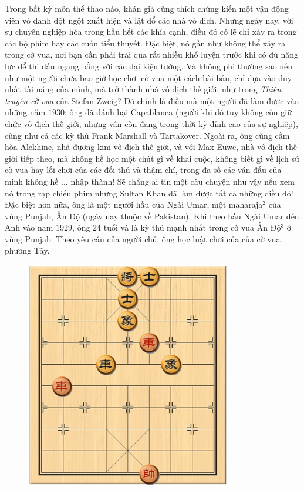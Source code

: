 \vspace*{170pt}
\begin{multicols}{2}
	Trong bất kỳ môn thể thao nào, khán giả cũng thích chứng kiến một vận động viên vô danh đột ngột xuất hiện và lật đổ các nhà vô địch. Nhưng ngày nay, với sự chuyên nghiệp hóa trong hầu hết các khía cạnh, điều đó có lẽ chỉ xảy ra trong các bộ phim hay các cuốn tiểu thuyết. Đặc biệt, nó gần như không thể xảy ra trong cờ vua, nơi bạn cần phải trải qua rất nhiều khổ luyện trước khi có đủ năng lực để thi đấu ngang bằng với các đại kiện tướng. Và không phi thường sao nếu như một người chưa bao giờ học chơi cờ vua một cách bài bản, chỉ dựa vào duy nhất tài năng của mình, mà trở thành nhà vô địch thế giới, như trong \textit{Thiên truyện cờ vua} của Stefan Zweig?
	\vskip 0.05cm
	Đó chính là điều mà một người đã làm được vào những năm $1930$: ông đã đánh bại Capablanca (người khi đó tuy không còn giữ chức vô địch thế giới, nhưng vẫn còn đang trong thời kỳ đỉnh cao của sự nghiệp), cũng như cả các kỳ thủ Frank Marshall và Tartakover. Ngoài ra, ông cũng cầm hòa Alekhine, nhà đương kim vô địch thế giới, và với Max Euwe, nhà vô địch thế giới tiếp theo, mà không hề học một chút gì về khai cuộc, không biết gì về lịch sử cờ vua hay lối chơi của các đối thủ và thậm chí, trong đa số các ván đấu của mình không hề ... nhập thành!
	\vskip 0.1cm
	Sẽ chẳng ai tin một câu chuyện như vậy nếu xem nó trong rạp chiếu phim nhưng Sultan Khan đã làm được tất cả những điều đó! Đặc biệt hơn nữa, ông là một người hầu của Ngài Umar, một maharaja$^2$ của vùng Punjab, Ấn Độ (ngày nay thuộc về Pakistan). Khi theo hầu Ngài Umar đến Anh vào năm $1929$, ông $24$ tuổi và là kỳ thủ mạnh nhất trong cờ vua Ấn Độ$^3$ ở vùng Punjab. Theo yêu cầu của người chủ, ông học luật chơi của của cờ vua phương Tây.
	\begin{figure}[H]
		\vspace*{-5pt}
		\centering
		\captionsetup{labelformat= empty, justification=centering}
		\includegraphics[width= 0.58\linewidth]{1}

\end{figure}
\end{multicols}
